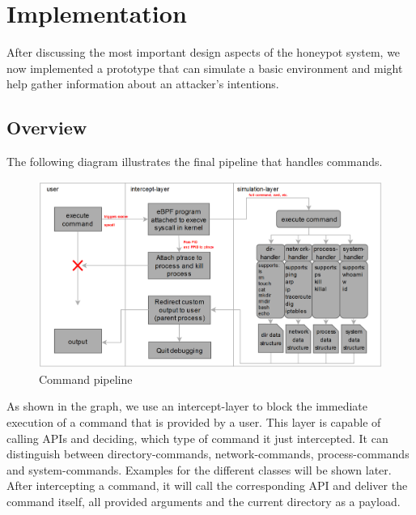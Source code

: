 \chapter{Implementation}
\label{chap:basics}

After discussing the most important design aspects of the honeypot system, we now implemented a prototype that can simulate a basic environment and might help gather information about an attacker's intentions. 

\section{Overview}
The following diagram illustrates the final pipeline that handles commands.


\begin{figure}[H]
    \centering
    \includegraphics[width=1\linewidth]{bilder/pipeline.PNG}
    \caption{Command pipeline}
    \label{fig:enter-label}
\end{figure}


As shown in the graph, we use an intercept-layer to block the immediate execution of a command that is provided by a user. This layer is capable of calling APIs and deciding, which type of command it just intercepted. It can distinguish between directory-commands, network-commands, process-commands and system-commands. Examples for the different classes will be shown later.
After intercepting a command, it will call the corresponding API and deliver the command itself, all provided arguments and the current directory as a payload.

